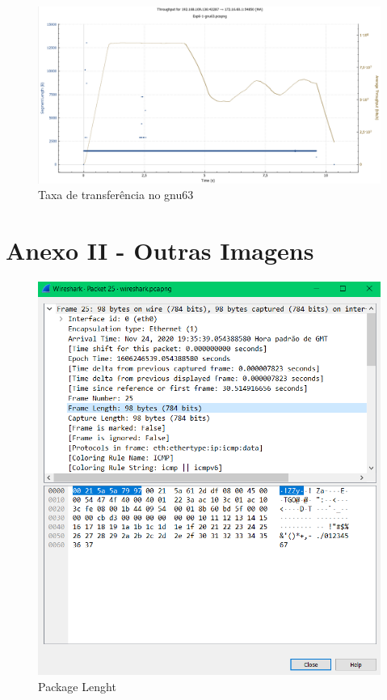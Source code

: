 \documentclass[article, a4paper, 11pt, oneside]{memoir}
\begin{document}
\begin{figure}[h]
	\centering
\includegraphics[scale=0.35]{exp6-step5-gnu63-graph.png}
\caption{Taxa de transferência no gnu63}
\end{figure}

\newpage
\section{Anexo II - Outras Imagens}
\begin{figure}[h]
	\centering
\includegraphics[scale=0.30]{package-length.png}
\caption{Package Lenght}
\end{figure}
\end{document}
